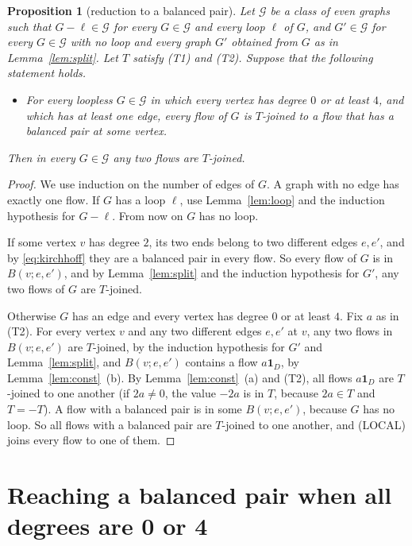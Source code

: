 \documentclass[11pt]{article}
\newtheorem{proposition}[theorem]{Proposition}
\theoremstyle{definition}
\newcommand{\cG}{\mathcal{G}}
\newcommand{\one}{\mathbf{1}}
\begin{document}
\begin{proposition}[reduction to a balanced pair]\label{prop:red}
Let $\cG$ be a class of even graphs such that $G-\ell\in\cG$ for every $G\in\cG$ and every loop $\ell$ of $G$, and
$G'\in\cG$ for every $G\in\cG$ with no loop and every graph $G'$ obtained from $G$ as in Lemma~\ref{lem:split}. Let
$T$ satisfy \textup{(T1)} and \textup{(T2)}. Suppose that the following statement holds.
\begin{itemize}[leftmargin=4.6em,labelsep=0.5em]
\item[\textup{(LOCAL)}] For every loopless $G\in\cG$ in which every vertex has degree $0$
or at least $4$, and which has at least one edge, every flow of $G$ is $T$-joined to a flow that has a balanced pair at some vertex.
\end{itemize}
Then in every $G\in\cG$ any two flows are $T$-joined.
\end{proposition}
\begin{proof}
We use induction on the number of edges of $G$. A graph with no edge has exactly one flow. If $G$ has a loop $\ell$, use
Lemma~\ref{lem:loop} and the induction hypothesis for $G-\ell$. From now on $G$ has no loop.

If some vertex $v$ has degree $2$, its two ends belong to two different edges $e,e'$, and by \eqref{eq:kirchhoff}
they are a balanced pair in every flow. So every flow of $G$ is in $B(v;e,e')$, and by Lemma~\ref{lem:split} and the
induction hypothesis for $G'$, any two flows of $G$ are $T$-joined.

Otherwise $G$ has an edge and every vertex has degree $0$ or at least $4$. Fix $a$ as in \textup{(T2)}. For every
vertex $v$ and any two different edges $e,e'$ at $v$, any two flows in $B(v;e,e')$ are $T$-joined, by the induction
hypothesis for $G'$ and Lemma~\ref{lem:split}, and $B(v;e,e')$ contains a flow $a\one_D$, by
Lemma~\ref{lem:const}~(b). By Lemma~\ref{lem:const}~(a) and \textup{(T2)}, all flows $a\one_D$ are $T$-joined to one another (if $2a\ne 0$, the value
$-2a$ is in $T$, because $2a\in T$ and $T=-T$). A flow with a balanced pair is in some $B(v;e,e')$, because $G$ has
no loop. So all flows with a balanced pair are $T$-joined to one another, and \textup{(LOCAL)} joins every flow to
one of them.
\end{proof}

\section{Reaching a balanced pair when all degrees are 0 or 4}\label{sec:local}
\end{document}

